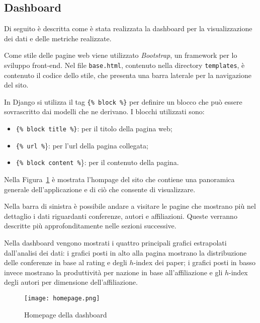 
\subsection{Dashboard}
Di seguito è descritta come è stata realizzata la dashboard per la visualizzazione dei dati e delle metriche realizzate.

Come stile delle pagine web viene utilizzato \textit{Bootstrap}, un framework per lo sviluppo front-end. 
Nel file \texttt{base.html}, contenuto nella directory \texttt{templates}, è contenuto il codice dello stile, che presenta una barra laterale per la navigazione del sito.

In Django si utilizza il tag \texttt{\{\% block \%\}} per definire un blocco che può essere sovrascritto dai modelli che ne derivano. I blocchi utilizzati sono:

\begin{itemize}
  \item \texttt{\{\% block title \%\}}: per il titolo della pagina web;
  \item \texttt{\{\% url \%}\}: per l'url della pagina collegata;
  \item \texttt{\{\% block content \%}\}: per il contenuto della pagina.
\end{itemize}

Nella Figura~\ref{fig:homepage} è mostrata l'hompage del sito che contiene una panoramica generale dell'applicazione e di ciò che consente di visualizzare.

Nella barra di sinistra è possibile andare a visitare le pagine che mostrano più nel dettaglio i dati riguardanti conferenze, autori e affiliazioni. Queste verranno descritte più approfonditamente nelle sezioni successive.

Nella dashboard vengono mostrati i quattro principali grafici estrapolati dall'analisi dei dati: i grafici posti in alto alla pagina mostrano la distribuzione delle conferenze in base al rating e degli $h$-index dei paper; i grafici posti in basso invece mostrano la produttività per nazione in base all'affiliazione e gli $h$-index degli autori per dimensione dell'affiliazione.

\begin{figure}
  \centering
  \texttt{[image: homepage.png]}
  \caption{Homepage della dashboard}
  \label{fig:homepage}
\end{figure}

